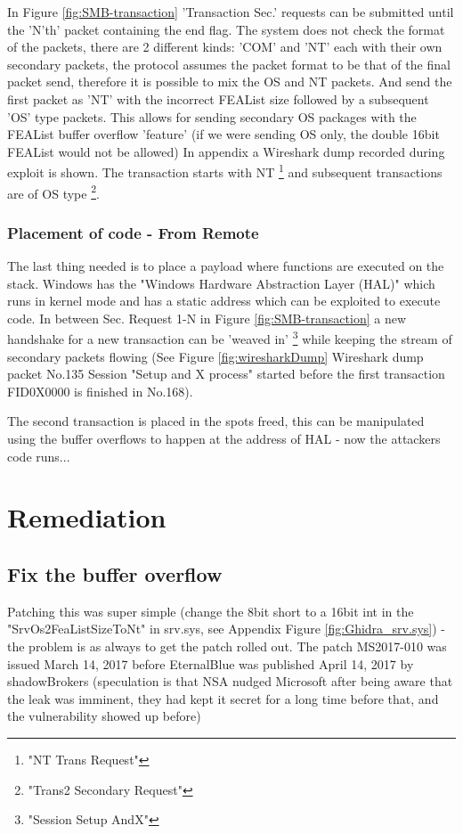 \documentclass[
	letterpaper, %
	10pt, %
	unnumberedsections, %
	twoside, %
]{LTJournalArticle}
\begin{document}
In Figure \ref{fig:SMB-transaction} 'Transaction Sec.' requests can be submitted until the 'N'th' packet containing the end flag. The system does not check the format of the packets, there are 2 different kinds: 'COM' and 'NT' each with their own secondary packets, the protocol assumes the packet format to be that of the final packet send, therefore it is possible to mix the OS and NT packets. And send the first packet as 'NT' with the incorrect FEAList size followed by a subsequent 'OS' type packets. This allows for sending secondary OS packages with the FEAList buffer overflow 'feature' (if we were sending OS only, the double 16bit FEAList would not be allowed)
\newline
In appendix a Wireshark dump recorded during exploit is shown. The transaction starts with NT \footnote{"NT Trans Request"} and subsequent transactions are of OS type \footnote{"Trans2 Secondary Request"}.      

\subsubsection{Placement of code - From Remote}
The last thing needed is to place a payload where functions are executed on the stack. Windows has the "Windows Hardware Abstraction Layer (HAL)" which runs in kernel mode and has a static address \cite{h3xduck} which can be exploited to execute code.  
\newline  
In between Sec. Request 1-N in Figure \ref{fig:SMB-transaction} a new handshake for a new transaction can be 'weaved in' \footnote{"Session Setup AndX"} while keeping the stream of secondary packets flowing (See  Figure \ref{fig:wiresharkDump} Wireshark dump packet No.135 Session "Setup and X process" started before the first transaction FID0X0000 is finished in No.168).     

The second transaction is placed in the spots freed, this can be manipulated using the buffer overflows to happen at the address of HAL - now the attackers code runs...         

\section{Remediation} 

\subsection{Fix the buffer overflow}
Patching this was super simple (change the 8bit short to a 16bit int in the "SrvOs2FeaListSizeToNt" in srv.sys, see Appendix Figure \ref{fig:Ghidra_srv.sys}) - the problem is as always to get the patch rolled out.
The patch MS2017-010 was issued March 14, 2017 \cite{MS2017-010} before EternalBlue was published April 14, 2017 \cite{enwiki:1219364760} by shadowBrokers (speculation is that NSA nudged Microsoft after being aware that the leak was imminent, they had kept it secret for a long time before that, and the vulnerability showed up before)
\end{document}

